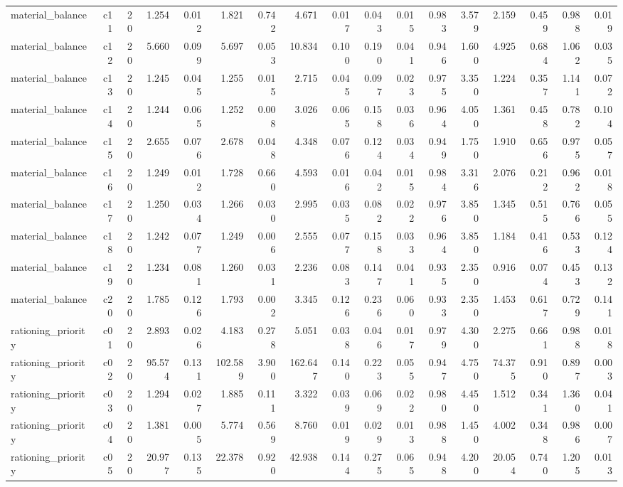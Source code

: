\begin{table}[htbp]
\begin{tabular}{lrrrrrrrrrrrrrrrr}
material\_balance & c11 & 20 & 1.254 & 0.012 & 1.821 & 0.742 & 4.671 & 0.017 & 0.043 & 0.015 & 0.983 & 3.579 & 2.159 & 0.459 & 0.988 & 0.019 \\
material\_balance & c12 & 20 & 5.660 & 0.099 & 5.697 & 0.053 & 10.834 & 0.100 & 0.190 & 0.041 & 0.946 & 1.600 & 4.925 & 0.684 & 1.062 & 0.035 \\
material\_balance & c13 & 20 & 1.245 & 0.045 & 1.255 & 0.015 & 2.715 & 0.045 & 0.097 & 0.023 & 0.975 & 3.350 & 1.224 & 0.357 & 1.141 & 0.072 \\
material\_balance & c14 & 20 & 1.244 & 0.065 & 1.252 & 0.008 & 3.026 & 0.065 & 0.158 & 0.036 & 0.964 & 4.050 & 1.361 & 0.458 & 0.782 & 0.104 \\
material\_balance & c15 & 20 & 2.655 & 0.076 & 2.678 & 0.048 & 4.348 & 0.076 & 0.124 & 0.034 & 0.949 & 1.750 & 1.910 & 0.656 & 0.975 & 0.057 \\
material\_balance & c16 & 20 & 1.249 & 0.012 & 1.728 & 0.660 & 4.593 & 0.016 & 0.042 & 0.015 & 0.984 & 3.316 & 2.076 & 0.212 & 0.962 & 0.018 \\
material\_balance & c17 & 20 & 1.250 & 0.034 & 1.266 & 0.030 & 2.995 & 0.035 & 0.082 & 0.022 & 0.976 & 3.850 & 1.345 & 0.515 & 0.766 & 0.055 \\
material\_balance & c18 & 20 & 1.242 & 0.077 & 1.249 & 0.006 & 2.555 & 0.077 & 0.158 & 0.033 & 0.964 & 3.850 & 1.184 & 0.416 & 0.533 & 0.124 \\
material\_balance & c19 & 20 & 1.234 & 0.081 & 1.260 & 0.031 & 2.236 & 0.083 & 0.147 & 0.041 & 0.935 & 2.350 & 0.916 & 0.074 & 0.453 & 0.132 \\
material\_balance & c20 & 20 & 1.785 & 0.126 & 1.793 & 0.002 & 3.345 & 0.126 & 0.236 & 0.060 & 0.933 & 2.350 & 1.453 & 0.617 & 0.729 & 0.141 \\
rationing\_priority & c01 & 20 & 2.893 & 0.026 & 4.183 & 0.278 & 5.051 & 0.038 & 0.046 & 0.017 & 0.979 & 4.300 & 2.275 & 0.661 & 0.988 & 0.018 \\
rationing\_priority & c02 & 20 & 95.574 & 0.131 & 102.589 & 3.900 & 162.647 & 0.140 & 0.223 & 0.055 & 0.947 & 4.750 & 74.375 & 0.910 & 0.897 & 0.003 \\
rationing\_priority & c03 & 20 & 1.294 & 0.027 & 1.885 & 0.111 & 3.322 & 0.039 & 0.069 & 0.022 & 0.980 & 4.450 & 1.512 & 0.341 & 1.360 & 0.041 \\
rationing\_priority & c04 & 20 & 1.381 & 0.005 & 5.774 & 0.569 & 8.760 & 0.019 & 0.029 & 0.013 & 0.988 & 1.450 & 4.002 & 0.348 & 0.986 & 0.007 \\
rationing\_priority & c05 & 20 & 20.977 & 0.135 & 22.378 & 0.920 & 42.938 & 0.144 & 0.275 & 0.065 & 0.948 & 4.200 & 20.054 & 0.740 & 1.205 & 0.013 \\

\end{tabular}
\end{table}
